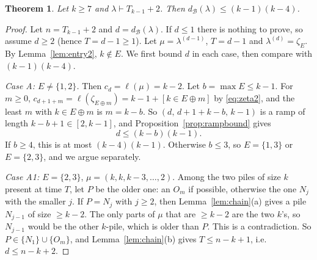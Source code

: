\documentclass[11pt]{article}
\newtheorem{theorem}{Theorem}[section]
\theoremstyle{definition}
\newcommand{\dB}{d_{\mathcal{B}}}
\renewcommand{\le}{\leqslant}
\renewcommand{\ge}{\geqslant}
\begin{document}
\begin{theorem}\label{thm:c5upper}
Let $k\ge7$ and $\lambda\vdash T_{k-1}+2$.  Then $\dB(\lambda)\le(k-1)(k-4)$.
\end{theorem}
\begin{proof}
Let $n=T_{k-1}+2$ and $d=\dB(\lambda)$.  If $d\le1$ there is nothing to prove, so assume $d\ge2$ (hence $T=d-1\ge1$).  Let $\mu=\lambda^{(d-1)}$, $T=d-1$ and $\lambda^{(d)}=\zeta_E$.  By
Lemma~\ref{lem:entry2}, $k\notin E$.  We first bound $d$ in each case, then compare with $(k-1)(k-4)$.

\emph{Case A: $E\ne\{1,2\}$.}  Then $c_d=\ell(\mu)=k-2$.  Let $b=\max E\le k-1$.  For $m\ge0$,
$c_{d+1+m}=\ell(\zeta_{E\oplus m})=k-1+[k\in E\oplus m]$ by \eqref{eq:zeta2}, and the least $m$ with $k\in E\oplus m$ is $m=k-b$.
So $(d,\,d+1+k-b,\,k-1)$ is a ramp of length $k-b+1\in[2,k-1]$, and Proposition~\ref{prop:rampbound} gives
\begin{equation}\label{eq:caseA}
d\le(k-b)(k-1).
\end{equation}
If $b\ge4$, this is at most $(k-4)(k-1)$.  Otherwise $b\le3$, so $E=\{1,3\}$ or $E=\{2,3\}$, and we argue separately.

\emph{Case A1: $E=\{2,3\}$}, $\mu=(k,k,k-3,\dots,2)$.  Among the two piles of size $k$ present at time $T$, let $P$ be the
older one: an $O_m$ if possible, otherwise the one $N_j$ with the smaller $j$.  If $P=N_j$ with $j\ge2$, then
Lemma~\ref{lem:chain}(a) gives a pile $N_{j-1}$ of size $\ge k-2$.  The only parts of $\mu$ that are $\ge k-2$ are the
two $k$'s, so $N_{j-1}$ would be the other $k$-pile, which is older than $P$.  This is a contradiction.  So
$P\in\{N_1\}\cup\{O_m\}$, and Lemma~\ref{lem:chain}(b) gives $T\le n-k+1$, i.e.\ $d\le n-k+2$.


\end{proof}
\end{document}
